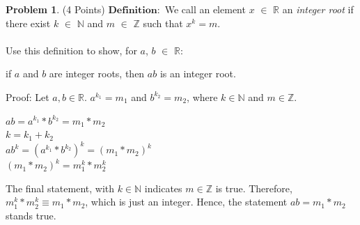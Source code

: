 \documentclass[letterpaper, 12pt]{article}
\theoremstyle{definition}
\newtheorem{pb}{Problem} %
\begin{document}
\vspace{10cm}
\begin{pb}
    (4 Points) $\mathbf{Definition:}$ We call an element $x$ $\in$ $\mathbb{R}$ an \textit{integer root} if there exist $k$ $\in$ $\mathbb{N}$ and $m$ $\in$ $\mathbb{Z}$ such that $x^k = m$.\\\\
    Use this definition to show, for $a$, $b$ $\in$ $\mathbb{R}$:
    \begin{center}
    if $a$ and $b$ are integer roots, then $a$$b$ is an integer root.
    \end{center}
    Proof: Let $a, b \in \mathbb{R}$. $a^{k_{1}} = m_{1}$ and $b^{k_{2}} = m_{2}$, where $k \in \mathbb{N}$ and $m \in \mathbb{Z}$.
    \begin{center}
        $ab = a^{k_{1}} * b^{k_{2}} = m_{1} * m_{2}$\\
        \vspace{3mm}
        $k = k_{1} + k_{2}$\\
        \vspace{3mm}
        $ab^k = (a^{k_{1}} * b^{k_{2}})^k = (m_{1} * m_{2})^k$\\
        \vspace{3mm}
        $(m_{1} * m_{2})^k = m_{1}^{k} * m_{2}^{k}$
    \end{center}
    The final statement, with $k \in \mathbb{N}$ indicates $m \in \mathbb{Z}$ is true. Therefore, $m_{1}^{k} * m_{2}^{k} \equiv m_{1} * m_{2}$, which is just an integer. Hence, the statement $ab = m_{1} * m_{2}$ stands true.
\end{pb}
\end{document}
